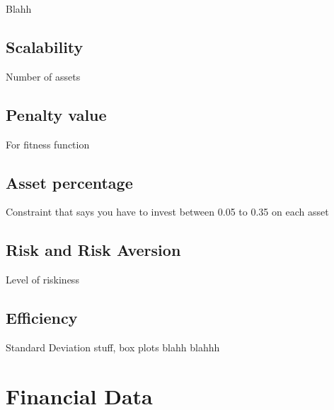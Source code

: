 \documentclass{pdfmx4020}
\begin{document}
      Blahh



  \section{Scalability} %
  \label{sec:scalability}
    Number of assets

  \section{Penalty value} %
  \label{sec:penalty_value}
    For fitness function

  \section{Asset percentage} %
  \label{sec:asset_percentage}
    Constraint that says you have to invest between 0.05 to 0.35 on each asset

  \section{Risk and Risk Aversion} %
  \label{sec:risk_and_risk_aversion}
    Level of riskiness

  \section{Efficiency} %
  \label{sec:efficiency}
    Standard Deviation stuff, box plots blahh blahhh



\chapter{Financial Data}
\end{document}
